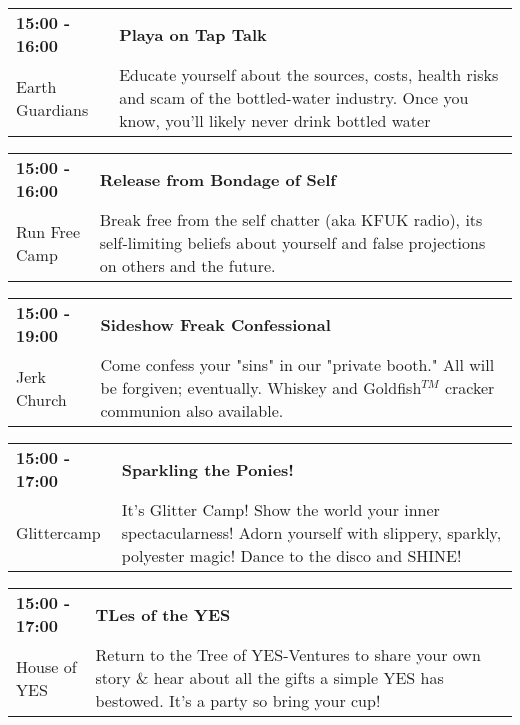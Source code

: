 \begin{tabular}{ p{1in} p{2.2in} }
    \textbf{15:00 - 16:00} & \textbf{Playa on Tap Talk} \\
    Earth Guardians \newline  & Educate yourself about the sources, costs, health risks and scam of the bottled-water industry. Once you know, you'll likely never drink bottled water \\
    \hline 
\end{tabular}
    
\begin{tabular}{ p{1in} p{2.2in} }
    \textbf{15:00 - 16:00} & \textbf{Release from Bondage of Self} \\
    Run Free Camp \newline  & Break free from the self chatter (aka KFUK radio), its self-limiting beliefs about yourself and false projections on others and the future. \\
    \hline 
\end{tabular}
    
\begin{tabular}{ p{1in} p{2.2in} }
    \textbf{15:00 - 19:00} & \textbf{Sideshow Freak Confessional} \\
    Jerk Church \newline  & Come confess your "sins" in our "private booth." All will be forgiven; eventually. Whiskey and Goldfish$^{TM}$ cracker communion also available. \\
    \hline 
\end{tabular}
    
\begin{tabular}{ p{1in} p{2.2in} }
    \textbf{15:00 - 17:00} & \textbf{Sparkling the Ponies!} \\
    Glittercamp \newline  & It's Glitter Camp! Show the world your inner spectacularness!  Adorn yourself with slippery, sparkly, polyester magic!  Dance to the disco and SHINE! \\
    \hline 
\end{tabular}
    
\begin{tabular}{ p{1in} p{2.2in} }
    \textbf{15:00 - 17:00} & \textbf{TLes of the YES} \\
    House of YES \newline  & Return to the Tree of YES-Ventures to share your own story \& hear about all the gifts a simple YES has bestowed. It's a party so bring your cup! \\
    \hline 
\end{tabular}
    
